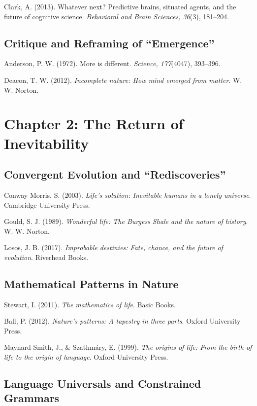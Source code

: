 \documentclass[
  openright]{book}
\begin{document}
Clark, A. (2013). Whatever next? Predictive brains, situated agents, and
the future of cognitive science. \emph{Behavioral and Brain Sciences,
36}(3), 181--204.

\subsection{Critique and Reframing of
``Emergence''}\label{critique-and-reframing-of-emergence-1}

Anderson, P. W. (1972). More is different. \emph{Science, 177}(4047),
393--396.

Deacon, T. W. (2012). \emph{Incomplete nature: How mind emerged from
matter}. W. W. Norton.

\section{Chapter 2: The Return of
Inevitability}\label{chapter-2-the-return-of-inevitability-1}

\subsection{Convergent Evolution and
``Rediscoveries''}\label{convergent-evolution-and-rediscoveries-1}

Conway Morris, S. (2003). \emph{Life's solution: Inevitable humans in a
lonely universe}. Cambridge University Press.

Gould, S. J. (1989). \emph{Wonderful life: The Burgess Shale and the
nature of history}. W. W. Norton.

Losos, J. B. (2017). \emph{Improbable destinies: Fate, chance, and the
future of evolution}. Riverhead Books.

\subsection{Mathematical Patterns in
Nature}\label{mathematical-patterns-in-nature-2}

Stewart, I. (2011). \emph{The mathematics of life}. Basic Books.

Ball, P. (2012). \emph{Nature's patterns: A tapestry in three parts}.
Oxford University Press.

Maynard Smith, J., \& Szathmáry, E. (1999). \emph{The origins of life:
From the birth of life to the origin of language}. Oxford University
Press.

\subsection{Language Universals and Constrained
Grammars}\label{language-universals-and-constrained-grammars-1}
\end{document}

